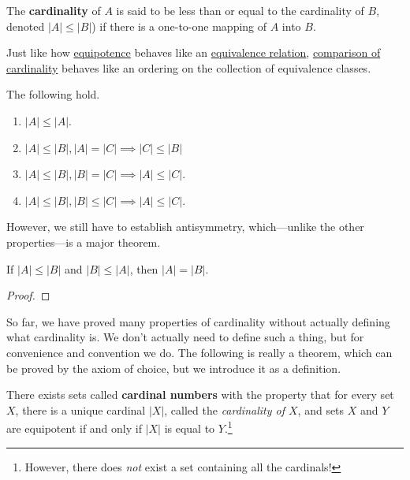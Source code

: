   \begin{definition}
    \label{def:comparison-of-cardinality}
    The \textbf{cardinality} of $A$ is said to be less than or equal to the cardinality of $B$, denoted $|A| \leq |B|$) if there is a one-to-one mapping of $A$ into $B$. 
  \end{definition} 

  Just like how \hyperref[def:equipotence]{equipotence} behaves like an \hyperref[def:equivalence_relation]{equivalence relation}, \hyperref[def:comparison-of-cardinality]{comparison of cardinality} behaves like an ordering on the collection of equivalence classes. 

  \begin{theorem}
    \label{thm:order-properties-of-cardinals}
    The following hold. 
    \begin{enumerate}
      \item $|A| \leq |A|$. 
      \item $|A| \leq |B|, |A| = |C| \implies |C| \leq |B|$ 
      \item $|A| \leq |B|, |B| = |C| \implies |A| \leq |C|$. 
      \item $|A| \leq |B|, |B| \leq |C| \implies |A| \leq |C|$. 
    \end{enumerate}
  \end{theorem}

  However, we still have to establish antisymmetry, which---unlike the other properties---is a major theorem. 

  \begin{theorem}
    \label{thm:cantor-bernstein}
    If $|A| \leq |B|$ and $|B| \leq |A|$, then $|A| = |B|$. 
  \end{theorem}
  \begin{proof}
    
  \end{proof} 

  So far, we have proved many properties of cardinality without actually defining what cardinality is. We don't actually need to define such a thing, but for convenience and convention we do. The following is really a theorem, which can be proved by the axiom of choice, but we introduce it as a definition. 

  \begin{definition}
    \label{def:cardinal-numbers}
    There exists sets called \textbf{cardinal numbers} with the property that for every set $X$, there is a unique cardinal $|X|$, called the \textit{cardinality of $X$}, and sets $X$ and $Y$ are equipotent if and only if $|X|$ is equal to $Y$.\footnote{However, there does \textit{not} exist a set containing all the cardinals!}
  \end{definition} 

